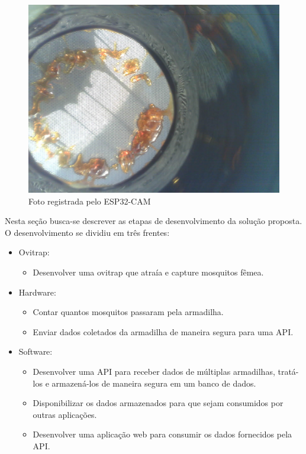 \documentclass[
	12pt,				%
	openright,			%
	oneside,			%
	a4paper,			%
	chapter=TITLE,		%
	english,			%
	brazil				%
	]{abntex2}
\begin{document}
\begin{figure}[H]
    \centering
    \includegraphics[scale=0.1]{imagens/fotoESP32.jpeg}
    \caption{Foto registrada pelo ESP32-CAM}
        \label{fig:fotoesp32}
    \end{figure}

Nesta seção busca-se descrever as etapas de desenvolvimento da solução proposta. O desenvolvimento se dividiu em três frentes:

\begin{itemize}
    \item Ovitrap:
        \begin{itemize}
        \item Desenvolver uma ovitrap que atraía e capture mosquitos fêmea.
        \end{itemize}
    \item Hardware:
        \begin{itemize}
        \item Contar quantos mosquitos passaram pela armadilha.
        \item Enviar dados coletados da armadilha de maneira segura para uma API.
        \end{itemize}
    \item Software:
        \begin{itemize}
        \item Desenvolver uma API para receber dados de múltiplas armadilhas, tratá-los e armazená-los de maneira segura em um 
        banco de dados.
        \item Disponibilizar os dados armazenados para que sejam consumidos por outras aplicações.
        \item Desenvolver uma aplicação web para consumir os dados fornecidos pela API.
        \end{itemize}
\end{itemize}
\end{document}
